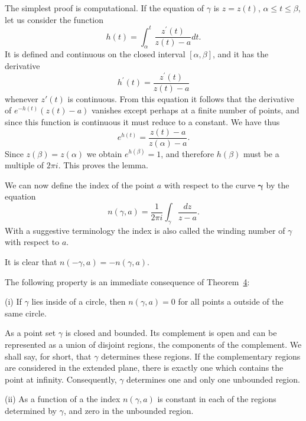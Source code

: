 The simplest proof is computational. If the equation of $\gamma$ is $z = z(t)$, $\alpha \leq t \leq \beta$, let us consider the function
\begin{equation*}
h (t) = \int_ {\alpha} ^ {t} \frac {z ^ {\prime} (t)}{z (t) - a} d t.
\end{equation*}
It is defined and continuous on the closed interval $[\alpha,\beta]$, and it has the derivative
\begin{equation*}
h ^ {\prime} (t) = \frac {z ^ {\prime} (t)}{z (t) - a}
\end{equation*}
whenever $z'(t)$ is continuous. From this equation it follows that the derivative of $e^{-h(t)}(z(t) - a)$ vanishes except perhaps at a finite number of points, and since this function is continuous it must reduce to a constant. We have thus
\begin{equation*}
e ^ {h (t)} = \frac {z (t) - a}{z (\alpha) - a}.
\end{equation*}
Since $z(\beta) = z(\alpha)$ we obtain $e^{h(\beta)} = 1$, and therefore $h(\beta)$ must be a multiple of $2\pi i$. This proves the lemma.

We can now define the index of the point $a$ with respect to the curve $\pmb{\gamma}$ by the equation
\begin{equation*}
n (\gamma , a) = \frac {1}{2 \pi i} \int_ {\gamma} \frac {d z}{z - a}.
\end{equation*}
With a suggestive terminology the index is also called the winding number of $\gamma$ with respect to $a$.

It is clear that $n(-\gamma, a) = -n(\gamma, a)$.

The following property is an immediate consequence of Theorem~\hyperref[thm:4.4]{4}:


(i) If $\gamma$ lies inside of a circle, then $n(\gamma, a) = 0$ for all points a outside of the same circle.

As a point set $\gamma$ is closed and bounded. Its complement is open and can be represented as a union of disjoint regions, the components of the complement. We shall say, for short, that $\gamma$ determines these regions. If the complementary regions are considered in the extended plane, there is exactly one which contains the point at infinity. Consequently, $\gamma$ determines one and only one unbounded region.

(ii) As a function of a the index $n(\gamma, a)$ is constant in each of the regions determined by $\gamma$, and zero in the unbounded region.

